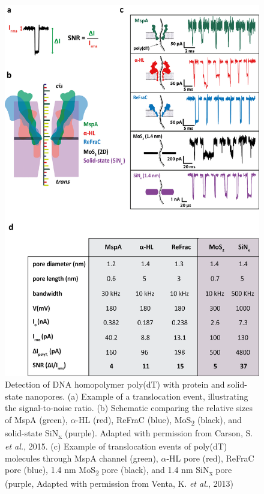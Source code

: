 \begin{figure}[H]
	\centering
	\includegraphics[width=0.7\linewidth]{figures/Figure3.4.png}
	\caption{Detection of DNA homopolymer poly(dT) with protein and solid-state nanopores. (a) Example of a translocation event, illustrating the signal-to-noise ratio. (b) Schematic comparing the relative sizes of MspA (green), $\alpha$-HL (red), ReFraC (blue),  MoS\textsubscript{2} (black), and solid-state SiN\textsubscript{x} (purple). Adapted with permission from Carson, S. \emph{et al.}, 2015.
		(c) Example of translocation events of poly(dT) molecules through MspA \cite{Derrington2010} channel (green), $\alpha$-HL pore (red), ReFraC pore (blue), 1.4 nm MoS\textsubscript{2} pore (black), and 1.4 nm SiN\textsubscript{x} pore (purple, Adapted with permission from Venta, K. \emph{et al.}, 2013)
}
\end{figure}
